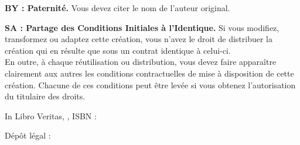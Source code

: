 {\setlength{\parskip}{1.5\baselineskip}
	\textbf{BY : Paternité.} Vous devez citer le nom de l'auteur original.\par
	\textbf{SA : Partage des Conditions Initiales à l'Identique.} Si vous modifiez, transformez ou adaptez cette création, vous n'avez le droit de distribuer la création qui en résulte que sous un contrat identique à celui-ci.\\
	En outre, à chaque réutilisation ou distribution, vous devez faire apparaître clairement aux autres les conditions contractuelles de mise à disposition de cette création. Chacune de ces conditions peut être levée si vous obtenez l'autorisation du titulaire des droits.\par
}
{\centering\setlength{\parskip}{2\baselineskip}
	In Libro Veritas, \anneedepot{}, ISBN : \isbn\par
	Dépôt légal : \datedepot\par
}
